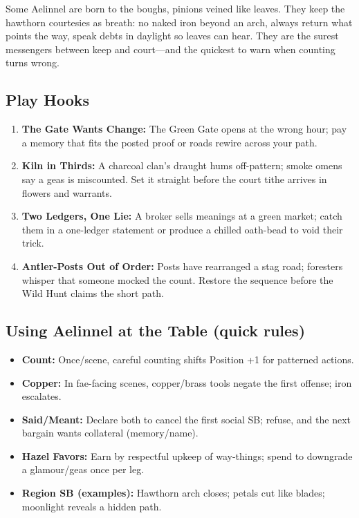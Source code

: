 \documentclass[11pt,letterpaper]{article}
\begin{document}
Some Aelinnel are born to the boughs, pinions veined like leaves. They keep the hawthorn courtesies as breath: no naked iron beyond an arch, always return what points the way, speak debts in daylight so leaves can hear. They are the surest messengers between keep and court---and the quickest to warn when counting turns wrong.

\subsection*{Play Hooks}
\begin{enumerate}
\item \textbf{The Gate Wants Change:} The Green Gate opens at the wrong hour; pay a memory that fits the posted proof or roads rewire across your path.
\item \textbf{Kiln in Thirds:} A charcoal clan's draught hums off-pattern; smoke omens say a geas is miscounted. Set it straight before the court tithe arrives in flowers and warrants.
\item \textbf{Two Ledgers, One Lie:} A broker sells meanings at a green market; catch them in a one-ledger statement or produce a chilled oath-bead to void their trick.
\item \textbf{Antler-Posts Out of Order:} Posts have rearranged a stag road; foresters whisper that someone mocked the count. Restore the sequence before the Wild Hunt claims the short path.
\end{enumerate}

\subsection*{Using Aelinnel at the Table (quick rules)}
\begin{itemize}
\item \textbf{Count:} Once/scene, careful counting shifts Position +1 for patterned actions.
\item \textbf{Copper:} In fae-facing scenes, copper/brass tools negate the first offense; iron escalates.
\item \textbf{Said/Meant:} Declare both to cancel the first social SB; refuse, and the next bargain wants collateral (memory/name).
\item \textbf{Hazel Favors:} Earn by respectful upkeep of way-things; spend to downgrade a glamour/geas once per leg.
\item \textbf{Region SB (examples):} Hawthorn arch closes; petals cut like blades; moonlight reveals a hidden path.
\end{itemize}
\end{document}

